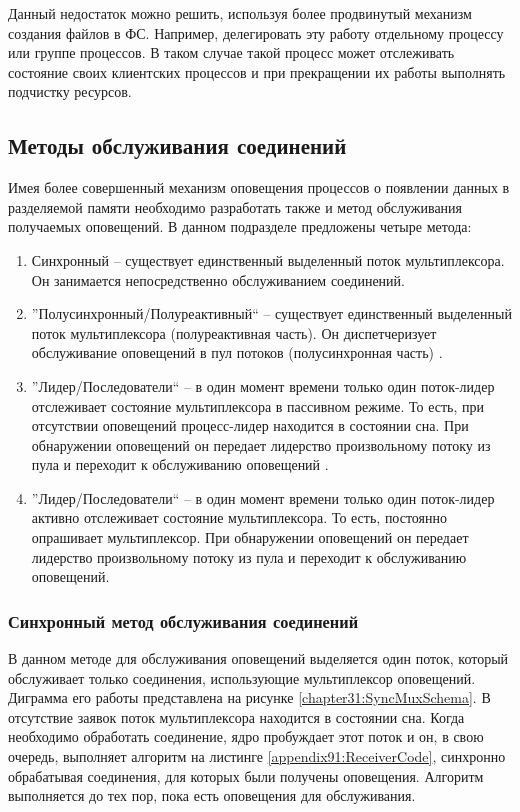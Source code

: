 Данный недостаток можно решить, используя более продвинутый механизм создания файлов в ФС. Например, делегировать эту работу отдельному процессу или группе процессов. В таком случае такой процесс может отслеживать состояние своих клиентских процессов и при прекращении их работы выполнять подчистку ресурсов.

\subsection{Методы обслуживания соединений}

Имея более совершенный механизм оповещения процессов о появлении данных в разделяемой памяти необходимо разработать также и метод обслуживания получаемых оповещений. В данном подразделе предложены четыре метода:
\begin{enumerate}
\item Синхронный -- существует единственный выделенный поток мультиплексора. Он занимается непосредственно обслуживанием соединений.
\item ''Полусинхронный/Полуреактивный`` -- существует единственный выделенный поток мультиплексора (полуреактивная часть). Он диспетчеризует обслуживание оповещений в пул потоков (полусинхронная часть) \cite{schmidt1995half}.
\item ''Лидер/Последователи`` -- в один момент времени только один поток-лидер отслеживает состояние мультиплексора в пассивном режиме. То есть, при отсутствии оповещений процесс-лидер находится в состоянии сна. При обнаружении оповещений он передает лидерство произвольному потоку из пула и переходит к обслуживанию оповещений \cite{schmidt1998leader}.
\item ''Лидер/Последователи`` -- в один момент времени только один поток-лидер активно отслеживает состояние мультиплексора. То есть, постоянно опрашивает мультиплексор. При обнаружении оповещений он передает лидерство произвольному потоку из пула и переходит к обслуживанию оповещений.
\end{enumerate}

\subsubsection{Синхронный метод обслуживания соединений}

В данном методе для обслуживания оповещений выделяется один поток, который обслуживает только соединения, использующие мультиплексор оповещений. Диграмма его работы представлена на рисунке \ref{chapter31:SyncMuxSchema}.
В отсутствие заявок поток мультиплексора находится в состоянии сна. Когда необходимо обработать соединение, ядро пробуждает этот поток и он, в свою очередь, выполняет алгоритм на листинге \ref{appendix91:ReceiverCode}, синхронно обрабатывая соединения, для которых были получены оповещения. Алгоритм выполняется до тех пор, пока есть оповещения для обслуживания.

